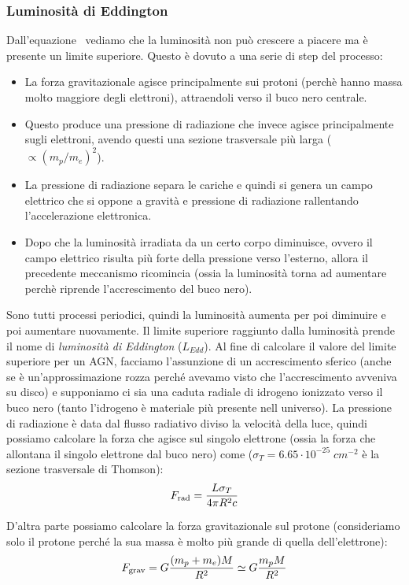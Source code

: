 \subsubsection{Luminosità di Eddington}
Dall'equazione~ vediamo che la luminosità non può crescere a piacere ma è presente un limite superiore. Questo è dovuto a una serie di step del processo:
\begin{itemize}
    \item La forza gravitazionale agisce principalmente sui protoni (perchè hanno massa molto maggiore degli elettroni), attraendoli verso il buco nero centrale.
    \item Questo produce una pressione di radiazione che invece agisce principalmente sugli elettroni, avendo questi una sezione trasversale più larga ($\propto (m_p/m_e)^2$).
    \item La pressione di radiazione separa le cariche e quindi si genera un campo elettrico che si oppone a gravità e pressione di radiazione rallentando l'accelerazione elettronica.
    \item Dopo che la luminosità irradiata da un certo corpo diminuisce, ovvero il campo elettrico risulta più forte della pressione verso l'esterno, allora il precedente meccanismo ricomincia (ossia la luminosità torna ad aumentare perchè riprende l'accrescimento del buco nero).
\end{itemize}
Sono tutti processi periodici, quindi la luminosità aumenta per poi diminuire e poi aumentare nuovamente. Il limite superiore raggiunto dalla luminosità prende il nome di \emph{luminosità di Eddington} ($L_{Edd}$). Al fine di calcolare il valore del limite superiore per un AGN, facciamo l'assunzione di un accrescimento sferico (anche se è un’approssimazione rozza perché avevamo visto che l’accrescimento avveniva su disco) e supponiamo ci sia una caduta radiale di idrogeno ionizzato verso il buco nero (tanto l'idrogeno è materiale più presente nell universo). La pressione di radiazione è data dal flusso radiativo diviso la velocità della luce, quindi possiamo calcolare la forza che agisce sul singolo elettrone (ossia la forza che allontana il singolo elettrone dal buco nero) come ($\sigma_T = 6.65 \cdot 10^{-25} \;\si{cm^{-2}}$ è la sezione trasversale di Thomson):
\begin{equation*}
    F_\textup{rad} = \frac{L\sigma_T}{4\pi R^2 c}
\end{equation*}

D’altra parte possiamo calcolare la forza gravitazionale sul protone (consideriamo solo il protone perché la sua massa è molto più grande di quella dell'elettrone):
\begin{equation*}
    F_\textup{grav} = G\frac{(m_p+m_e)M}{R^2} \simeq G\frac{m_pM}{R^2}
\end{equation*}

